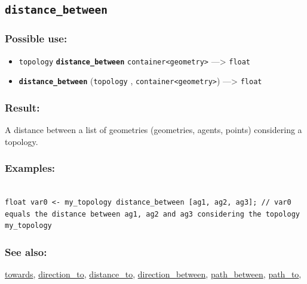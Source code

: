 \documentclass[]{book}
\providecommand{\tightlist}{%
  \setlength{\itemsep}{0pt}\setlength{\parskip}{0pt}}
\theoremstyle{definition}
\theoremstyle{definition}
\theoremstyle{definition}
\theoremstyle{remark}
\begin{document}
\subsection{\texorpdfstring{\texttt{distance\_between}}{distance\_between}}\label{distance_between}

\subsubsection{Possible use:}\label{possible-use-135}

\begin{itemize}
\tightlist
\item
  \texttt{topology} \textbf{\texttt{distance\_between}}
  \texttt{container\textless{}geometry\textgreater{}} ---\textgreater{}
  \texttt{float}
\item
  \textbf{\texttt{distance\_between}} (\texttt{topology} ,
  \texttt{container\textless{}geometry\textgreater{}}) ---\textgreater{}
  \texttt{float}
\end{itemize}

\subsubsection{Result:}\label{result-131}

A distance between a list of geometries (geometries, agents, points)
considering a topology.

\subsubsection{Examples:}\label{examples-102}

\begin{verbatim}
 
float var0 <- my_topology distance_between [ag1, ag2, ag3]; // var0 equals the distance between ag1, ag2 and ag3 considering the topology my_topology
\end{verbatim}

\subsubsection{See also:}\label{see-also-80}

\href{operators-s-to-z.html\#towards}{towards},
\href{operators-d-to-h.html\#direction_to}{direction\_to},
\href{operators-d-to-h.html\#distance_to}{distance\_to},
\href{operators-d-to-h.html\#direction_between}{direction\_between},
\href{operators-n-to-r.html\#path_between}{path\_between},
\href{operators-n-to-r.html\#path_to}{path\_to},
\end{document}
